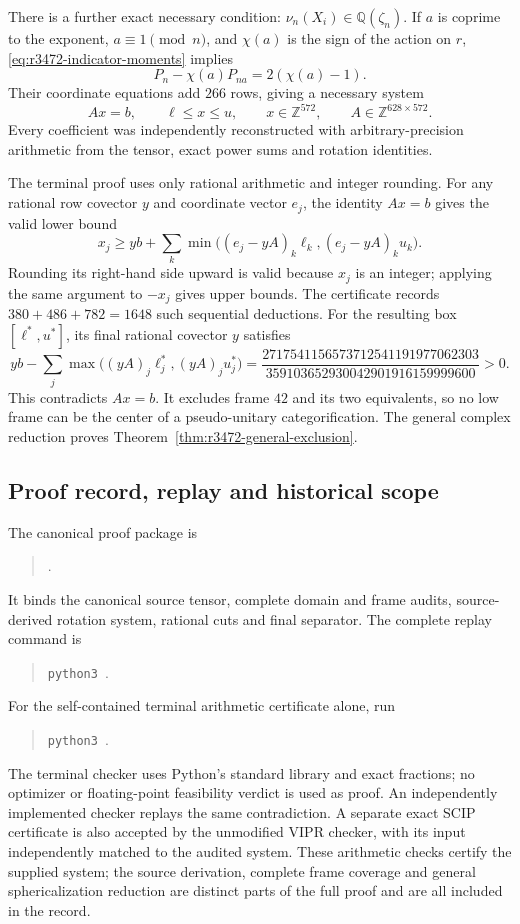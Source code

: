 There is a further exact necessary condition:
$\nu_n(X_i)\in\mathbb Q(\zeta_n)$.
If $a$ is coprime to the exponent, $a\equiv1\pmod n$, and
$\chi(a)$ is the sign of the action on $r$,
\eqref{eq:r3472-indicator-moments} implies
\[
 P_n-\chi(a)P_{na}=2(\chi(a)-1).
\]
Their coordinate equations add $266$ rows, giving a necessary system
\begin{equation}\label{eq:r3472-integer-system}
 A x=b,\qquad \ell\leq x\leq u,\qquad x\in\mathbb Z^{572},
 \qquad A\in\mathbb Z^{628\times572}.
\end{equation}
Every coefficient was independently reconstructed with arbitrary-precision
arithmetic from the tensor, exact power sums and rotation identities.

The terminal proof uses only rational arithmetic and integer rounding.
For any rational row covector $y$ and coordinate vector $e_j$, the
identity $Ax=b$ gives the valid lower bound
\[
 x_j\geq yb+
 \sum_k\min\bigl((e_j-yA)_k\ell_k,(e_j-yA)_ku_k\bigr).
\]
Rounding its right-hand side upward is valid because $x_j$ is an integer;
applying the same argument to $-x_j$ gives upper bounds.
The certificate records $380+486+782=1648$ such sequential deductions.
For the resulting box $[\ell^*,u^*]$, its final rational covector $y$ satisfies
\[
 yb-\sum_j\max\bigl((yA)_j\ell_j^*,(yA)_ju_j^*\bigr)
 =\frac{2717541156573712541191977062303}
        {359103652930042901916159999600}>0.
\]
This contradicts $Ax=b$. It excludes frame $42$ and its two equivalents,
so no low frame can be the center of a pseudo-unitary categorification.
The general complex reduction proves
Theorem~\ref{thm:r3472-general-exclusion}.

\subsection{Proof record, replay and historical scope}
The canonical proof package is
\begin{quote}\small{}.\end{quote}
It binds the canonical source tensor, complete domain and frame audits,
source-derived rotation system, rational cuts and final separator.
The complete replay command is
\begin{quote}\small
\texttt{python3 }.
\end{quote}
For the self-contained terminal arithmetic certificate alone, run
\begin{quote}\small
\texttt{python3 }.
\end{quote}
The terminal checker uses Python's standard library and exact fractions;
no optimizer or floating-point feasibility verdict is used as proof.
An independently implemented checker replays the same contradiction.
A separate exact SCIP certificate is also accepted by the unmodified
VIPR checker, with its input independently matched to the audited system.
These arithmetic checks certify the supplied system; the source derivation,
complete frame coverage and general sphericalization reduction are distinct
parts of the full proof and are all included in the record.

